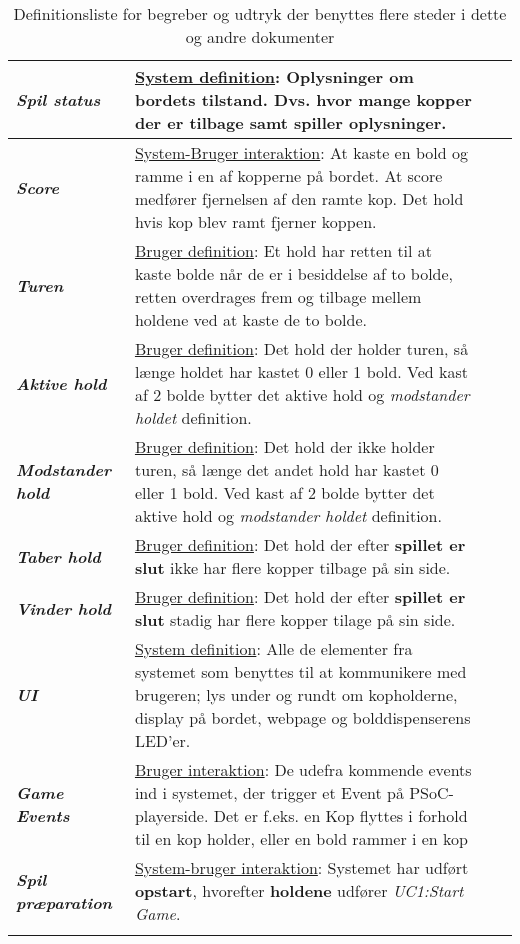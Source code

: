 \documentclass[Kravspecifikation/Kravspec_Main.tex]{subfiles}
\begin{document}
\begin{longtable}{|>{\centering\arraybackslash}m{3cm}|>{\RaggedRight\arraybackslash}m{10cm}| p{} | p{}|}
        \hline
        \textit{\textbf{Spil status}} & \underline{System definition}:
        Oplysninger om bordets tilstand. Dvs. hvor mange kopper der er tilbage samt spiller oplysninger.\\
        \hline
        \textit{\textbf{Score}} & \underline{System-Bruger interaktion}:
        At kaste en bold og ramme i en af kopperne på bordet. At score medfører fjernelsen af den ramte kop. Det hold hvis kop blev ramt fjerner koppen. \\
        \hline
        \textit{\textbf{Turen}} & \underline{Bruger definition}:
        Et hold har retten til at kaste bolde når de er i besiddelse af to bolde, retten overdrages frem og tilbage mellem holdene ved at kaste de to bolde. \\
        \hline
        \textit{\textbf{Aktive hold}} & \underline{Bruger definition}:
        Det hold der holder turen, så længe holdet har kastet 0 eller 1 bold. Ved kast af 2 bolde bytter det aktive hold og \textit{modstander holdet} definition.\\
        \hline
        \textit{\textbf{Modstander hold}} & \underline{Bruger definition}:
        Det hold der ikke holder turen, så længe det andet hold har kastet 0 eller 1 bold. Ved kast af 2 bolde bytter det aktive hold og \textit{modstander holdet} definition.\\
        \hline
        \textit{\textbf{Taber hold}} & \underline{Bruger definition}:
        Det hold der efter \textbf{spillet er slut} ikke har flere kopper tilbage på sin side.\\
        \hline
        \textit{\textbf{Vinder hold}} & \underline{Bruger definition}:
        Det hold der efter \textbf{spillet er slut} stadig har flere kopper tilage på sin side.\\
        \hline
        \textit{\textbf{UI}} & \underline{System definition}:
        Alle de elementer fra systemet som benyttes til at kommunikere med brugeren; lys under og rundt om kopholderne, display på bordet, webpage og bolddispenserens LED'er.\\
        \hline
        \textit{\textbf{Game Events}} & \underline{Bruger interaktion}:
        De udefra kommende events ind i systemet, der trigger et Event på PSoC-playerside. Det er f.eks. en Kop flyttes i forhold til en kop holder, eller en bold rammer i en kop\\
        \hline
        \textit{\textbf{Spil præparation}} & \underline{System-bruger interaktion}:
        Systemet har udført \textbf{opstart}, hvorefter \textbf{holdene} udfører \textit{UC1:Start Game}. \\
        \hline
        
    \caption{Definitionsliste for begreber og udtryk der benyttes flere steder i dette og andre dokumenter}
    \label{tab:def_liste}
    \end{longtable}
\end{document}
